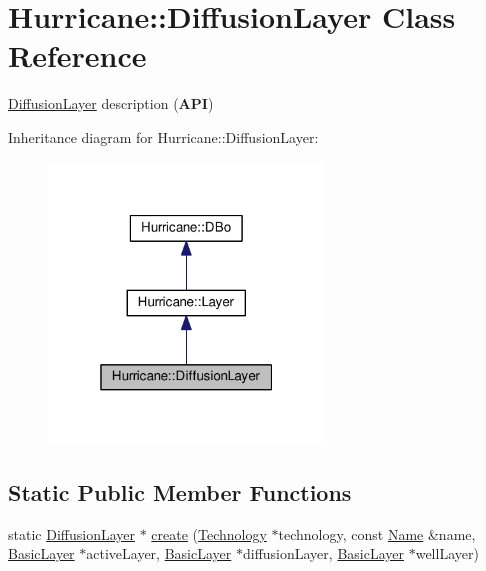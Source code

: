 \hypertarget{classHurricane_1_1DiffusionLayer}{\section{Hurricane\-:\-:Diffusion\-Layer Class Reference}
\label{classHurricane_1_1DiffusionLayer}
}


\hyperlink{classHurricane_1_1DiffusionLayer}{Diffusion\-Layer} description ({\bfseries A\-P\-I})  




Inheritance diagram for Hurricane\-:\-:Diffusion\-Layer\-:\nopagebreak
\begin{figure}[H]
\begin{center}
\leavevmode
\includegraphics[width=208pt]{classHurricane_1_1DiffusionLayer__inherit__graph}
\end{center}
\end{figure}
\subsection*{Static Public Member Functions}
\begin{DoxyCompactItemize}
\item 
static \hyperlink{classHurricane_1_1DiffusionLayer}{Diffusion\-Layer} $\ast$ \hyperlink{classHurricane_1_1DiffusionLayer_a91b5f8a20b005c20b4b9b9080250939e}{create} (\hyperlink{classHurricane_1_1Technology}{Technology} $\ast$technology, const \hyperlink{classHurricane_1_1Name}{Name} \&name, \hyperlink{classHurricane_1_1BasicLayer}{Basic\-Layer} $\ast$active\-Layer, \hyperlink{classHurricane_1_1BasicLayer}{Basic\-Layer} $\ast$diffusion\-Layer, \hyperlink{classHurricane_1_1BasicLayer}{Basic\-Layer} $\ast$well\-Layer)
\end{DoxyCompactItemize}
